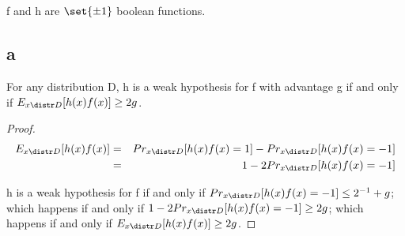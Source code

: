 \documentclass[10pt]{amsart}
\begin{document}
\section{}
\begin{rem}
f and h are $\set{\pm 1}$ boolean functions.
\end{rem}

\subsection{a}
\begin{thm}
For any distribution D, h is a weak hypothesis for f with advantage g if and only if $E_{x \distr D}[h(x)f(x)]\geq 2g$.
\end{thm}
\begin{proof}
\begin{eqnarray*}
E_{x \distr D}[h(x)f(x)] &=& Pr_{x\distr D}[h(x)f(x)= 1] - Pr_{x\distr D}[h(x)f(x)= -1]\\
&=& 1-2Pr_{x\distr D}[h(x)f(x)= -1]\\
\end{eqnarray*}


h is a weak hypothesis for f if and only if $Pr_{x\distr D}[h(x)f(x)= -1] \leq 2^{-1}+g$; which happens if and only if $1-2Pr_{x\distr D}[h(x)f(x)= -1] \geq 2g$; which happens if and only if $E_{x \distr D}[h(x)f(x)]\geq 2g$.
\end{proof}
\end{document}
